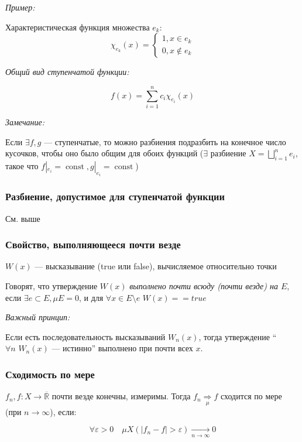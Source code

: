 \documentclass{article}
\def\dbl{\,\,}
\DeclareMathOperator{\const}{const}
\begin{document}
\textit{Пример:}

Характеристическая функция множества $e_k$: 
\[\chi_{e_k}(x) = \begin{cases}
    1, x \in e_k \\
    0, x \notin e_k
\end{cases}\]

\textit{Общий вид ступенчатой функции:}

\[f(x) = \sum_{i = 1}^{n} c_i \chi_{e_i}(x)\]

\textit{Замечание:}

Если $\exists f, g$ --- ступенчатые, то можно разбиения подразбить на конечное число кусочков, чтобы оно было общим для обоих функций ($\exists$ разбиение $X = \bigsqcup_{i = 1}^{n} e_i$, такое что $f|_{e_i} = \const, g|_{e_i} = \const$)

\subsubsection{Разбиение, допустимое для ступенчатой функции}

См. выше

\subsubsection{Свойство, выполняющееся почти везде}

$W(x)$ --- высказывание (true или false), вычисляемое относительно точки

Говорят, что утверждение $W(x)$ \textit{выполнено почти всюду (почти везде) на $E$}, если $\exists e \subset E, \mu E = 0$, и для $\forall x \in E \setminus e \dbl W(x) == true$

\textit{Важный принцип:}

Если есть последовательность высказываний $W_n(x)$, тогда утверждение ``$\forall n \dbl W_n(x)$ --- истинно'' выполнено при почти всех $x$.

\subsubsection{Сходимость по мере}

$f_n, f: X \rightarrow \overline{\mathbb{R}}$ почти везде конечны, измеримы. Тогда $f_n \underset{\mu}{\Longrightarrow} f$ сходится по мере (при $n \rightarrow \infty$), если: 

\[\forall \varepsilon > 0 \quad \mu X(|f_n - f| > \varepsilon) \underset{n \rightarrow \infty}{\longrightarrow} 0\]
\end{document}
